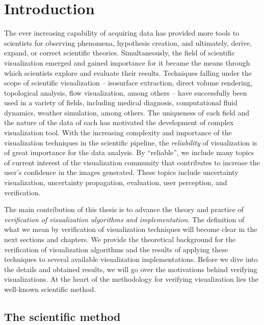 \chapter{Introduction}

The ever increasing capability of acquiring data has provided more tools to scientists for observing phenomena, hypothesis creation, and ultimately,  derive, expand, or correct scientific theories. Simultaneously, the field of scientific visualization emerged and gained importance for it became the means through which scientists explore and evaluate their results. Techniques falling under the scope of scientific visualization -- isosurface extraction, direct volume rendering, topological analysis, flow visualization, among others -- have successfully been used in a variety of fields, including medical diagnosis, computational fluid dynamics, weather simulation, among others. The uniqueness of each field and the nature of the data of each has motivated the development of complex visualization tool. With the increasing complexity and importance of the visualization techniques in the scientific pipeline, the \emph{reliability} of visualization is of great importance for the data analysis. By ``reliable'', we include many topics of current interest of the visualization community that contributes to increase the user's confidence in the images generated. These topics include uncertainty visualization, uncertainty propagation, evaluation, user perception, and verification. 

The main contribution of this thesis is to advance the theory and practice of \emph{verification of visualization algorithms and implementation}.  The definition of what we mean by verification of visualization techniques will become clear in the next sections and chapters. We provide the theoretical background for the verification of visualization algorithms and the results of applying these techniques to several available visualization implementations. Before we dive into the details and obtained results, we will go over the motivations behind verifying visualizations. At the heart of the methodology for verifying visualization lies the well-known scientific method. 

\section{The scientific method}


